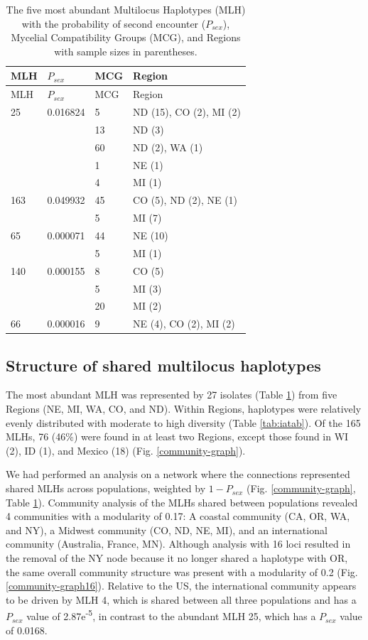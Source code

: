 \begin{longtable}[]{@{}llll@{}}
\caption{\label{tab:mlg-table} The five most abundant Multilocus Haplotypes
(MLH) with the probability of second encounter (\(P_{sex}\)), Mycelial
Compatibility Groups (MCG), and Regions with sample sizes in
parentheses.}\tabularnewline
\toprule
MLH & \(P_{sex}\) & MCG & Region\tabularnewline
\midrule
\endfirsthead
\toprule
MLH & \(P_{sex}\) & MCG & Region\tabularnewline
\midrule
\endhead
25 & 0.016824 & 5 & ND (15), CO (2), MI (2)\tabularnewline
& & 13 & ND (3)\tabularnewline
& & 60 & ND (2), WA (1)\tabularnewline
& & 1 & NE (1)\tabularnewline
& & 4 & MI (1)\tabularnewline
163 & 0.049932 & 45 & CO (5), ND (2), NE (1)\tabularnewline
& & 5 & MI (7)\tabularnewline
65 & 0.000071 & 44 & NE (10)\tabularnewline
& & 5 & MI (1)\tabularnewline
140 & 0.000155 & 8 & CO (5)\tabularnewline
& & 5 & MI (3)\tabularnewline
& & 20 & MI (2)\tabularnewline
66 & 0.000016 & 9 & NE (4), CO (2), MI (2)\tabularnewline
\bottomrule
\end{longtable}

\subsection*{Structure of shared multilocus
haplotypes}\label{structure-of-shared-multilocus-haplotypes}

The most abundant MLH was represented by 27 isolates (Table
\ref{tab:mlg-table}) from five Regions (NE, MI, WA, CO, and ND). Within
Regions, haplotypes were relatively evenly distributed with moderate to
high diversity (Table \ref{tab:iatab}). Of the 165 MLHs, 76 (46\%) were
found in at least two Regions, except those found in WI (2), ID (1), and
Mexico (18) (Fig. \ref{community-graph}).

We had performed an analysis on a network where the connections
represented shared MLHs across populations, weighted by \(1 - P_{sex}\)
(Fig. \ref{community-graph}, Table \ref{tab:mlg-table}). Community
analysis of the MLHs shared between populations revealed 4 communities
with a modularity of 0.17: A coastal community (CA, OR, WA, and NY), a
Midwest community (CO, ND, NE, MI), and an international community
(Australia, France, MN). Although analysis with 16 loci resulted in the
removal of the NY node because it no longer shared a haplotype with OR,
the same overall community structure was present with a modularity of
0.2 (Fig. \ref{community-graph16}). Relative to the US, the
international community appears to be driven by MLH 4, which is shared
between all three populations and has a \(P_{sex}\) value of
2.87e\textsuperscript{-5}, in contrast to the abundant MLH 25, which has
a \(P_{sex}\) value of 0.0168.

